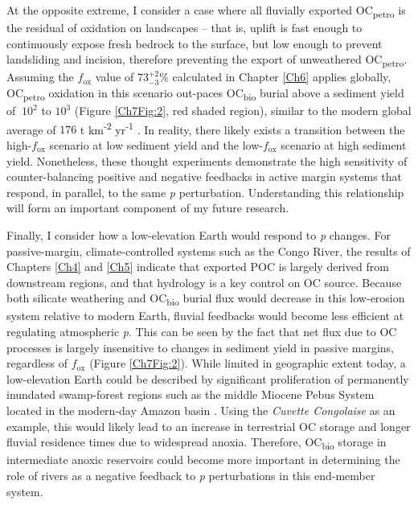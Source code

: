 At the opposite extreme, I consider a case where all fluvially exported OC\textsubscript{petro} is the residual of oxidation on landscapes -- that is, uplift is fast enough to continuously expose fresh bedrock to the surface, but low enough to prevent landsliding and incision, therefore preventing the export of unweathered OC\textsubscript{petro}. Assuming the $f_{\text{ox}}$ value of $73^{+2}_{-3}$\% calculated in Chapter \ref{Ch6} applies globally, OC\textsubscript{petro} oxidation in this scenario out-paces OC\textsubscript{bio} burial above a sediment yield of $~ 10^2$ to $10^3$ (Figure \ref{Ch7Fig:2}, red shaded region), similar to the modern global average of $176$ t km\textsuperscript{-2} yr\textsuperscript{-1} \citep{Galy:2015fx}. In reality, there likely exists a transition between the high-$f_{\text{ox}}$ scenario at low sediment yield and the low-$f_{\text{ox}}$ scenario at high sediment yield. Nonetheless, these thought experiments demonstrate the high sensitivity of counter-balancing positive and negative feedbacks in active margin systems that respond, in parallel, to the same \textit{p} perturbation. Understanding this relationship will form an important component of my future research.

Finally, I consider how a low-elevation Earth would respond to \textit{p} changes. For passive-margin, climate-controlled systems such as the Congo River, the results of Chapters \ref{Ch4} and \ref{Ch5} indicate that exported POC is largely derived from downstream regions, and that hydrology is a key control on OC source. Because both silicate weathering and OC\textsubscript{bio} burial flux would decrease in this low-erosion system relative to modern Earth, fluvial feedbacks would become less efficient at regulating atmospheric \textit{p}. This can be seen by the fact that net  flux due to OC processes is largely insensitive to changes in sediment yield in passive margins, regardless of $f_{\text{ox}}$ (Figure \ref{Ch7Fig:2}). While limited in geographic extent today, a low-elevation Earth could be described by significant proliferation of permanently inundated swamp-forest regions such as the middle Miocene Pebus System located in the modern-day Amazon basin \citep{Hoorn:1994vz}. Using the \textit{Cuvette Congolaise} as an example, this would likely lead to an increase in terrestrial OC storage and longer fluvial residence times due to widespread anoxia. Therefore, OC\textsubscript{bio} storage in intermediate anoxic reservoirs could become more important in determining the role of rivers as a negative feedback to \textit{p} perturbations in this end-member system. 

